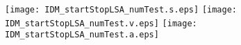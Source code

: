 \documentclass[a4paper,12pt]{article}
\begin{document}

\begin{center}
\texttt{[image: IDM\_startStopLSA\_numTest.s.eps]} 
\texttt{[image: IDM\_startStopLSA\_numTest.v.eps]}
\texttt{[image: IDM\_startStopLSA\_numTest.a.eps]}
\end{center}

\end{document}
